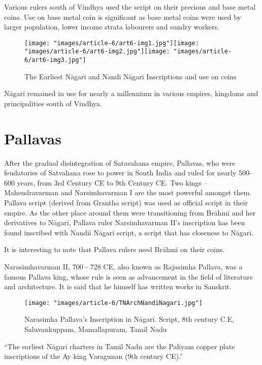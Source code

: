 Various rulers south of Vindhya used the script on their precious and base metal coins. Use on base metal coin is significant as base metal coins were used by larger population, lower income strata labourers and sundry workers.

\begin{figure}
\texttt{[image: "images/article-6/art6-img1.jpg"]}\texttt{[image: "images/article-6/art6-img2.jpg"]}\texttt{[image: "images/article-6/art6-img3.jpg"]}
\caption{The Earliest Nāgarī and Nandī Nāgarī Inscriptions and use on coins}
\end{figure}

Nāgarī remained in use for nearly a millennium in various empires, kingdoms and principalities south of Vindhya.


\section*{Pallavas}

After the gradual disintegration of Satavahana empire, Pallavas, who were feudatories of Satvahana rose to power in South India and ruled for nearly 500-600 years, from 3rd Century CE to 9th Century CE. Two kings – Mahendravarman and Narsimhavarman I are the most powerful amongst them. Pallava script (derived from Grantha script) was used as official script in their empire. As the other place around them were transitioning from Brāhmī and her derivatives to Nāgarī, Pallava ruler Narsimhavarman II’s inscription has been found inscribed with Nandīī Nāgarī script, a script that has closeness to Nāgarī.

It is interesting to note that Pallava rulers used Brāhmī on their coins.

Narasimhavarman II, 700 - 728 CE, also known as Rajasimha Pallava, was a famous Pallava king, whose rule is seen as advancement in the field of literature and architecture. It is said that he himself has written works in Sanskrit.

\begin{figure}
\texttt{[image: "images/article-6/TNArchNandiNagari.jpg"]}
\caption{Narasimha Pallava’s Inscription in Nāgarī. Script, 8th century C.E, Saluvankuppam, Mamallapuram, Tamil Nadu}
\end{figure}

“The earliest Nāgarī charters in Tamil Nadu are the Paliyam copper plate inscriptions of the Ay king Varagunan (9th century CE).”

